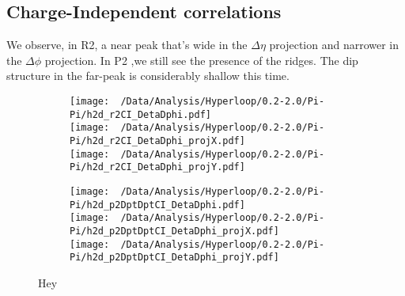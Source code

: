\documentclass[12pt,a4paper,twoside]{report}
\begin{document}
\subsection{Charge-Independent correlations}
We observe, in R2, a near peak that's wide in the $\Delta\eta$ projection and narrower in the $\Delta\phi$ projection. In P2 ,we still see the presence of the ridges. The dip structure in the far-peak is considerably shallow this time.
\begin{figure}[H]
	\begin{subfigure}{0.49\linewidth}
		\texttt{[image: ~/Data/Analysis/Hyperloop/0.2-2.0/Pi-Pi/h2d\_r2CI\_DetaDphi.pdf]}\\
		\texttt{[image: ~/Data/Analysis/Hyperloop/0.2-2.0/Pi-Pi/h2d\_r2CI\_DetaDphi\_projX.pdf]}\\
		\texttt{[image: ~/Data/Analysis/Hyperloop/0.2-2.0/Pi-Pi/h2d\_r2CI\_DetaDphi\_projY.pdf]}\\
	\end{subfigure}
	\begin{subfigure}{0.49\linewidth}
		\texttt{[image: ~/Data/Analysis/Hyperloop/0.2-2.0/Pi-Pi/h2d\_p2DptDptCI\_DetaDphi.pdf]}\\
		\texttt{[image: ~/Data/Analysis/Hyperloop/0.2-2.0/Pi-Pi/h2d\_p2DptDptCI\_DetaDphi\_projX.pdf]}\\
		\texttt{[image: ~/Data/Analysis/Hyperloop/0.2-2.0/Pi-Pi/h2d\_p2DptDptCI\_DetaDphi\_projY.pdf]}\\
	\end{subfigure}
	\caption{Hey}
\end{figure}
\end{document}
